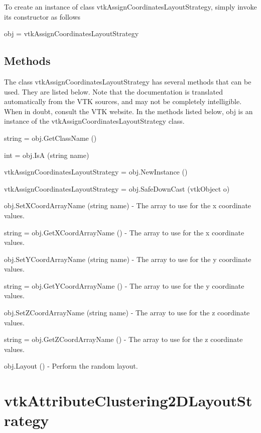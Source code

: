 To create an instance of class vtk\-Assign\-Coordinates\-Layout\-Strategy, simply invoke its constructor as follows \begin{DoxyVerb}  obj = vtkAssignCoordinatesLayoutStrategy
\end{DoxyVerb}
 \hypertarget{vtkwidgets_vtkxyplotwidget_Methods}{}\subsection{Methods}\label{vtkwidgets_vtkxyplotwidget_Methods}
The class vtk\-Assign\-Coordinates\-Layout\-Strategy has several methods that can be used. They are listed below. Note that the documentation is translated automatically from the V\-T\-K sources, and may not be completely intelligible. When in doubt, consult the V\-T\-K website. In the methods listed below, {\ttfamily obj} is an instance of the vtk\-Assign\-Coordinates\-Layout\-Strategy class. 
\begin{DoxyItemize}
\item {\ttfamily string = obj.\-Get\-Class\-Name ()}  
\item {\ttfamily int = obj.\-Is\-A (string name)}  
\item {\ttfamily vtk\-Assign\-Coordinates\-Layout\-Strategy = obj.\-New\-Instance ()}  
\item {\ttfamily vtk\-Assign\-Coordinates\-Layout\-Strategy = obj.\-Safe\-Down\-Cast (vtk\-Object o)}  
\item {\ttfamily obj.\-Set\-X\-Coord\-Array\-Name (string name)} -\/ The array to use for the x coordinate values.  
\item {\ttfamily string = obj.\-Get\-X\-Coord\-Array\-Name ()} -\/ The array to use for the x coordinate values.  
\item {\ttfamily obj.\-Set\-Y\-Coord\-Array\-Name (string name)} -\/ The array to use for the y coordinate values.  
\item {\ttfamily string = obj.\-Get\-Y\-Coord\-Array\-Name ()} -\/ The array to use for the y coordinate values.  
\item {\ttfamily obj.\-Set\-Z\-Coord\-Array\-Name (string name)} -\/ The array to use for the z coordinate values.  
\item {\ttfamily string = obj.\-Get\-Z\-Coord\-Array\-Name ()} -\/ The array to use for the z coordinate values.  
\item {\ttfamily obj.\-Layout ()} -\/ Perform the random layout.  
\end{DoxyItemize}\hypertarget{vtkinfovis_vtkattributeclustering2dlayoutstrategy}{}\section{vtk\-Attribute\-Clustering2\-D\-Layout\-Strategy}\label{vtkinfovis_vtkattributeclustering2dlayoutstrategy}
